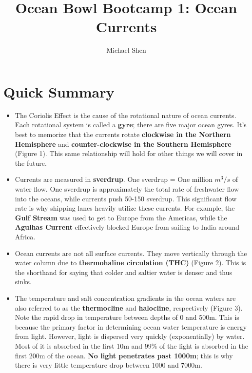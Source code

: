 \documentclass{article}
\begin{document}
\title{Ocean Bowl Bootcamp 1: Ocean Currents}
\author{Michael Shen}
\maketitle

\section{Quick Summary}
\begin{itemize}
	\item The Coriolis Effect is the cause of the rotational nature of ocean currents. Each rotational system is called a \textbf{gyre}; there are five major ocean gyres. It's best to memorize that the currents rotate \textbf{clockwise in the Northern Hemisphere} and \textbf{counter-clockwise in the Southern Hemisphere} (Figure 1). This same relationship will hold for other things we will cover in the future.
	\item Currents are measured in \textbf{sverdrup}. One sverdrup = One million $m^3/s$ of water flow. One sverdrup is approximately the total rate of freshwater flow into the oceans, while currents push 50-150 sverdrup. This significant flow rate is why shipping lanes heavily utilize these currents. For example, the \textbf{Gulf Stream} was used to get to Europe from the Americas, while the \textbf{Agulhas Current} effectively blocked Europe from sailing to India around Africa.
	\item Ocean currents are not all surface currents. They move vertically through the water column due to \textbf{thermohaline circulation (THC)} (Figure 2). This is the shorthand for saying that colder and saltier water is denser and thus sinks. 
	\item The temperature and salt concentration gradients in the ocean waters are also referred to as the \textbf{thermocline} and \textbf{halocline}, respectively (Figure 3). Note the rapid drop in temperature between depths of 0 and 500m. This is because the primary factor in determining ocean water temperature is energy from light. However, light is dispersed very quickly (exponentially) by water. Most of it is absorbed in the first 10m and 99\% of the light is absorbed in the first 200m of the ocean. \textbf{No light penetrates past 1000m}; this is why there is very little temperature drop between 1000 and 7000m. 
\end{itemize}
\end{document}
